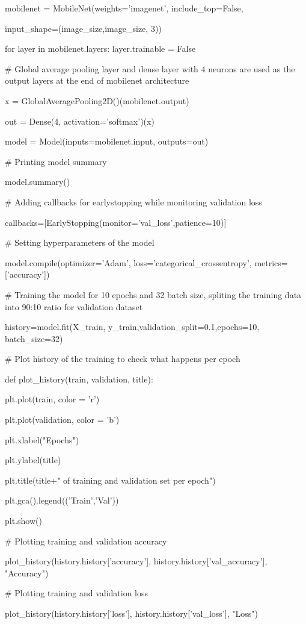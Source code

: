 \documentclass[12pt, a4paper,twoside]{report}
\theoremstyle{plain} %
\theoremstyle{definition} %
\theoremstyle{remark} %
\numberwithin{equation}{chapter}
\begin{document}
mobilenet = MobileNet(weights='imagenet', include\_top=False, 

input\_shape=(image\_size,image\_size, 3))

for layer in mobilenet.layers:
    layer.trainable = False

\# Global average pooling layer and dense layer with 4 neurons are used as the output layers at the end of mobilenet architecture

x = GlobalAveragePooling2D()(mobilenet.output)

out = Dense(4, activation='softmax')(x)

model = Model(inputs=mobilenet.input, outputs=out)

\# Printing model summary

model.summary()

\# Adding callbacks for earlystopping while monitoring validation loss

callbacks=[EarlyStopping(monitor='val\_loss',patience=10)]

\# Setting hyperparameters of the model

model.compile(optimizer='Adam', loss='categorical\_crossentropy', metrics=['accuracy'])

\# Training the model for 10 epochs and 32 batch size, spliting the training data into 90:10 ratio for validation dataset

history=model.fit(X\_train, y\_train,validation\_split=0.1,epochs=10, batch\_size=32)

\# Plot history of the training to check what happens per epoch

def plot\_history(train, validation, title):
  
  plt.plot(train, color = 'r')
  
  plt.plot(validation, color = 'b')
  
  plt.xlabel("Epochs")
  
  plt.ylabel(title)
  
  plt.title(title+" of training and validation set per epoch")
  
  plt.gca().legend(('Train','Val'))
  
  plt.show()

\# Plotting training and validation accuracy

plot\_history(history.history['accuracy'], history.history['val\_accuracy'], "Accuracy")

\# Plotting training and validation loss

plot\_history(history.history['loss'], history.history['val\_loss'], "Loss")
\end{document}
